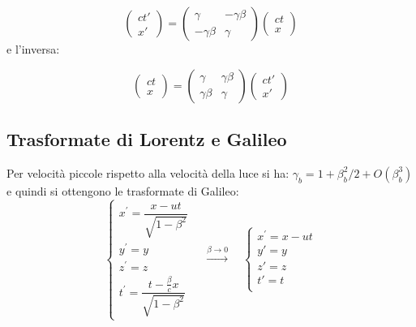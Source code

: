 \begin{equation}
   \begin{pmatrix} ct' \\ x'\end{pmatrix} = \begin{pmatrix}\gamma & -\gamma\beta\\ -\gamma\beta & \gamma\end{pmatrix}\begin{pmatrix}ct\\ x\end{pmatrix}
\end{equation}
e l'inversa:

\begin{equation}
   \begin{pmatrix} ct \\ x\end{pmatrix} = \begin{pmatrix}\gamma & \gamma\beta\\ \gamma\beta & \gamma\end{pmatrix}\begin{pmatrix}ct'\\ x'\end{pmatrix}
\end{equation}




\subsection{Trasformate di Lorentz e Galileo}

Per velocità piccole rispetto alla velocità della luce si ha: $\gamma_b = 1 + \beta_b^2 / 2 + O(\beta_b^3)$ e quindi si ottengono le trasformate di Galileo:
\[\left\{
   \begin{array}{l}
      x^\prime=\dfrac{x-ut}{\sqrt{1-\beta^2}} \\
      y^\prime=y                              \\
      z^\prime=z                              \\
      t^\prime=\dfrac{t-\frac{\beta}{c}x}{\sqrt{1-\beta^2}}
   \end{array}\right.
   \quad \stackrel{\beta\rightarrow 0}{\longrightarrow} \quad
   \left\{
   \begin{array}{l}
      x^\prime=x-ut \\
      y'=y          \\
      z'=z          \\
      t'=t          \\
   \end{array}\right.\]
 
